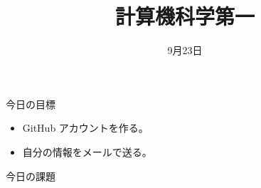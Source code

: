 \documentclass[a4paper]{article}
\title{計算機科学第一}
\date{9月23日}
\begin{document}
\maketitle

\noindent
今日の目標
\begin{itemize}
\item GitHub アカウントを作る。
\item 自分の情報をメールで送る。
\end{itemize}

\noindent
今日の課題
\begin{enumerate}
\end{enumerate}
\fi
\end{document}
